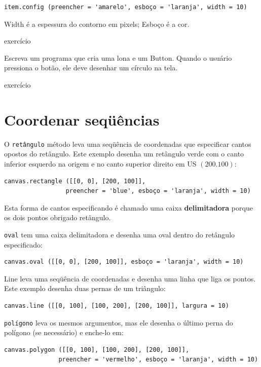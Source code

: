 \documentclass[10pt]{book}
\begin{document}
\begin{v erbatim}
\begin{verbatim}
item.config (preencher = 'amarelo', esboço = 'laranja', width = 10)
\end{verbatim}
%
{Width \tt} é a espessura do contorno em pixels;
{Esboço \tt} é a cor.

\begin{} exercício
\label{círculo}

Escreva um programa que cria uma lona e um Button. Quando o
usuário pressiona o botão, ele deve desenhar um círculo na tela.

\end{} exercício


\section{Coordenar seqüências}

O {\tt retângulo} método leva uma seqüência de coordenadas que
especificar cantos opostos do retângulo. Este exemplo
desenha um retângulo verde com o canto inferior esquerdo na origem
e no canto superior direito em US $ (200.100) $:

\begin{verbatim}
canvas.rectangle ([[0, 0], [200, 100]], 
                 preencher = 'blue', esboço = 'laranja', width = 10)
\end{verbatim}
%
Esta forma de cantos especificando é chamado
uma caixa {\bf delimitadora} porque os dois pontos
obrigado retângulo.

{\tt oval} tem uma caixa delimitadora e desenha uma oval
dentro do retângulo especificado:

\begin{verbatim}
canvas.oval ([[0, 0], [200, 100]], esboço = 'laranja', width = 10)
\end{verbatim}
%
{Line \tt} leva uma seqüência de coordenadas e desenha
uma linha que liga os pontos. Este exemplo desenha duas pernas
de um triângulo:

\begin{verbatim}
canvas.line ([[0, 100], [100, 200], [200, 100]], largura = 10)
\end{verbatim}
%
{\tt polígono} leva os mesmos argumentos, mas ele desenha o último
perna do polígono (se necessário) e enche-lo em:

\begin{verbatim}
canvas.polygon ([[0, 100], [100, 200], [200, 100]],
               preencher = 'vermelho', esboço = 'laranja', width = 10)
\end{verbatim}
%



\end{v erbatim}
\end{document}
